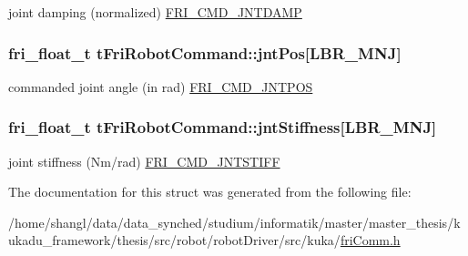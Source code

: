 joint damping (normalized) \hyperlink{friComm_8h_a028217ae73d39ea2d58c56892945d569}{\-F\-R\-I\-\_\-\-C\-M\-D\-\_\-\-J\-N\-T\-D\-A\-M\-P} \hypertarget{structtFriRobotCommand_a4bac642e487860d390d038354e2da10b}{
\subsubsection[{jnt\-Pos}]{\setlength{\rightskip}{0pt plus 5cm}fri\-\_\-float\-\_\-t {\bf t\-Fri\-Robot\-Command\-::jnt\-Pos}\mbox{[}{\bf \-L\-B\-R\-\_\-\-M\-N\-J}\mbox{]}}}\label{structtFriRobotCommand_a4bac642e487860d390d038354e2da10b}
commanded joint angle (in rad) \hyperlink{friComm_8h_a2c20df39b9b6f5df6b832c954c6f04b8}{\-F\-R\-I\-\_\-\-C\-M\-D\-\_\-\-J\-N\-T\-P\-O\-S} \hypertarget{structtFriRobotCommand_a7127d490d4fed38a755d5f8fb20bfa9c}{
\subsubsection[{jnt\-Stiffness}]{\setlength{\rightskip}{0pt plus 5cm}fri\-\_\-float\-\_\-t {\bf t\-Fri\-Robot\-Command\-::jnt\-Stiffness}\mbox{[}{\bf \-L\-B\-R\-\_\-\-M\-N\-J}\mbox{]}}}\label{structtFriRobotCommand_a7127d490d4fed38a755d5f8fb20bfa9c}
joint stiffness (\-Nm/rad) \hyperlink{friComm_8h_a311f522d33a0f536575d0d534ef7f57d}{\-F\-R\-I\-\_\-\-C\-M\-D\-\_\-\-J\-N\-T\-S\-T\-I\-F\-F} 

\-The documentation for this struct was generated from the following file\-:\begin{DoxyCompactItemize}
\item 
/home/shangl/data/data\-\_\-synched/studium/informatik/master/master\-\_\-thesis/kukadu\-\_\-framework/thesis/src/robot/robot\-Driver/src/kuka/\hyperlink{friComm_8h}{fri\-Comm.\-h}\end{DoxyCompactItemize}
